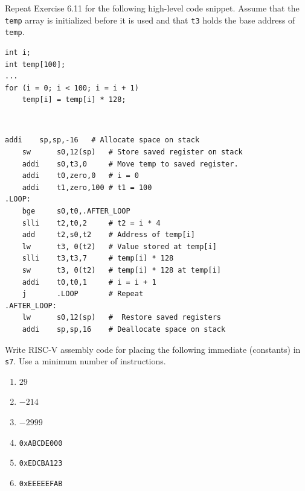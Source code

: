 \documentclass[12pt]{article}
\newenvironment{ex}[2][Exercise]{\begin{trivlist}
		\item[\hskip \labelsep {\bfseries #1}\hskip \labelsep {\bfseries #2.}]}{\end{trivlist}}
\newenvironment{sol}[1][Solution]{\begin{trivlist}
		\item[\hskip \labelsep {\bfseries #1:}]}{\end{trivlist}}
\begin{document}
\begin{ex}{6.12}
	Repeat Exercise 6.11 for the following high-level code snippet. Assume that
	the \texttt{temp} array is initialized before it is used and that
	\texttt{t3} holds the base address of \texttt{temp}.
	\begin{lstlisting}
int i;
int temp[100];
...
for (i = 0; i < 100; i = i + 1)
	temp[i] = temp[i] * 128;
	\end{lstlisting}
\end{ex}

\begin{sol}
	\
	\begin{lstlisting}[language={}]
	addi	sp,sp,-16	# Allocate space on stack
	sw		s0,12(sp)	# Store saved register on stack
	addi	s0,t3,0		# Move temp to saved register.
	addi	t0,zero,0	# i = 0
	addi	t1,zero,100	# t1 = 100
.LOOP:
	bge		s0,t0,.AFTER_LOOP
	slli	t2,t0,2		# t2 = i * 4
	add		t2,s0,t2	# Address of temp[i]
	lw		t3, 0(t2)	# Value stored at temp[i]
	slli	t3,t3,7		# temp[i] * 128
	sw		t3, 0(t2)	# temp[i] * 128 at temp[i]
	addi	t0,t0,1		# i = i + 1
	j 		.LOOP		# Repeat
.AFTER_LOOP:
	lw		s0,12(sp)	#  Restore saved registers
	addi	sp,sp,16	# Deallocate space on stack
	\end{lstlisting}
\end{sol}

\begin{ex}{6.13}
	Write RISC-V assembly code for placing the following immediate (constants)
	in \texttt{s7}. Use a minimum number of instructions.
	\begin{enumerate}[label=(\alph*)]
		\item $29$
		\item $-214$
		\item $-2999$
		\item \texttt{0xABCDE000}
		\item \texttt{0xEDCBA123}
		\item \texttt{0xEEEEEFAB}
	\end{enumerate}
\end{ex}
\end{document}
